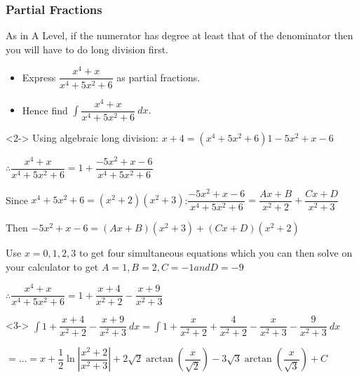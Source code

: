 \documentclass{beamer}
\begin{document}
	
	\begin{frame}[shrink=40]
		\frametitle{Partial Fractions}
		\alert{As in A Level, if the numerator has degree at least that of the denominator then you will have to do long division first.}
		
		\begin{problem}
			\begin{itemize}
				\item Express $\dfrac{x^{4}+x}{x^{4}+5x^{2}+6}$ as partial fractions.
				\item Hence find $\int \dfrac{x^{4}+x}{x^{4}+5x^{2}+6}\ dx.$
			\end{itemize}
		\end{problem}
		
		\begin{solution}<2->
			Using algebraic long division: $x+4 = (x^{4}+5x^{2}+6)1 -5x^{2}+x-6$
			
			$\therefore \dfrac{x^{4}+x}{x^{4}+5x^{2}+6}=1+\dfrac{-5x^{2}+x-6}{x^{4}+5x^{2}+6}$
			
			Since $x^{4}+5x^{2}+6 = (x^{2}+2)(x^{2}+3)$:$\dfrac{-5x^{2}+x-6}{x^{4}+5x^{2}+6} = \dfrac{Ax+B}{x^{2}+2}+\dfrac{Cx+D}{x^{2}+3}$
			
			Then $-5x^{2}+x-6 = (Ax+B)(x^{2}+3)+(Cx+D)(x^{2}+2)$
			
			Use $x=0,1,2,3$ to get four simultaneous equations which you can then solve on your calculator to get $A=1, B=2, C=-1 and D=-9$
			
			$\therefore \dfrac{x^{4}+x}{x^{4}+5x^{2}+6} = 1+\dfrac{x+4}{x^{2}+2}-\dfrac{x+9}{x^{2}+3}$
		\end{solution}
		
		\begin{solution}<3->
			$\int 1+\dfrac{x+4}{x^{2}+2}-\dfrac{x+9}{x^{2}+3}\ dx= \int 1+\dfrac{x}{x^{2}+2}+\dfrac{4}{x^{2}+2}-\dfrac{x}{x^{2}+3}-\dfrac{9}{x^{2}+3}\ dx$
			
			$=\ldots =x+\dfrac{1}{2}\ln \left| \dfrac{x^{2}+2}{x^{2}+3}\right| +2\sqrt{2}\arctan \left( \dfrac{x}{\sqrt{2}}\right) -3\sqrt{3}\arctan \left( \dfrac{x}{\sqrt{3}}\right) +C $
		\end{solution}
	\end{frame}
	
\end{document}

